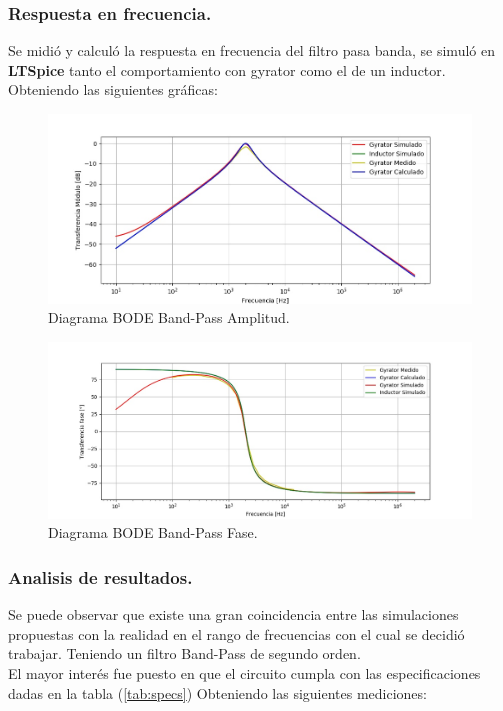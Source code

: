 \subsubsection{Respuesta en frecuencia.}
Se midió y calculó la respuesta en frecuencia del filtro pasa banda, se simuló en \textbf{LTSpice}  tanto el comportamiento con gyrator como el de un inductor. Obteniendo las siguientes gráficas:
\begin{figure}[H]	
	\centering
	\includegraphics[width=\textwidth]{ImagenesEj2/bodebp.jpg}
	\caption{Diagrama BODE Band-Pass Amplitud.}
	\label{fig:bodebp}
\end{figure}
\begin{figure}[H]	
	\centering
	\includegraphics[width=\textwidth]{ImagenesEj2/bodebpp.jpg}
	\caption{Diagrama BODE Band-Pass Fase.}
	\label{fig:bodebpp}
\end{figure}


\subsubsection{Analisis de resultados.}
Se puede observar que existe una gran coincidencia entre las simulaciones propuestas con la realidad en el rango de frecuencias con el cual se decidió trabajar. Teniendo un filtro Band-Pass de segundo orden.\\
El mayor interés fue puesto en que el circuito cumpla con las especificaciones dadas en la tabla (\ref{tab:specs})
Obteniendo las siguientes mediciones:

